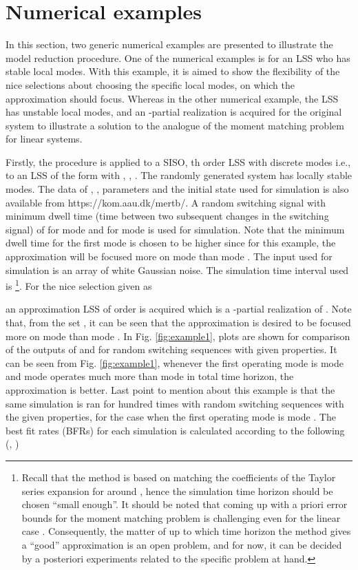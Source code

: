 \documentclass[journal]{IEEEtran}
\begin{document}
\section{Numerical examples}
\label{sec:exam}

In this section, two generic numerical examples are presented to illustrate the model reduction procedure. One of the numerical examples is for an LSS who has stable local modes. With this example, it is aimed to show the flexibility of the nice selections about choosing the specific local modes, on which the approximation should focus. Whereas in the other numerical example, the LSS has unstable local modes, and an -partial realization is acquired for the original system to illustrate a solution to the analogue of the moment matching problem for linear systems.

Firstly, the procedure is applied to a SISO, th order LSS with  discrete modes i.e., to an LSS  of the form  with , , . The randomly generated system has locally stable modes. The data of , ,  parameters and the initial state  used for simulation is also available from https://kom.aau.dk/\texttildelow mertb/. A random switching signal with minimum dwell time (time between two subsequent changes in the switching signal) of  for mode  and  for mode  is used for simulation. Note that the minimum dwell time for the first mode is chosen to be higher since for this example, the approximation will be focused more on mode  than mode . The input  used for simulation is an array of white Gaussian noise. The simulation time interval used is  \footnote{Recall that the method is based on matching the coefficients of the Taylor series expansion for  around , hence the simulation time horizon should be chosen ``small enough''. It should be noted that coming up with a priori error bounds for the moment matching problem is challenging even for the linear case \cite{antoulas}. Consequently, the matter of up to which time horizon the method gives a ``good'' approximation is an open problem, and for now, it can be decided by a posteriori experiments related to the specific problem at hand.}. For the nice selection  given as

an approximation LSS  of order  is acquired which is a -partial realization of . Note that, from the set , it can be seen that the approximation is desired to be focused more on mode  than mode . In Fig. \ref{fig:example1},  plots are shown for comparison of the outputs of  and  for random switching sequences  with given properties. It can be seen from Fig. \ref{fig:example1}, whenever the first operating mode is mode  and mode  operates much more than mode  in total time horizon, the approximation is better. Last point to mention about this example is that the same simulation is ran for  hundred times with random switching sequences with the given properties, for the case when the first operating mode is mode . The best fit rates (BFRs) for each simulation is calculated according to the following (\cite{ljung}, \cite{toth2012})
\end{document}
